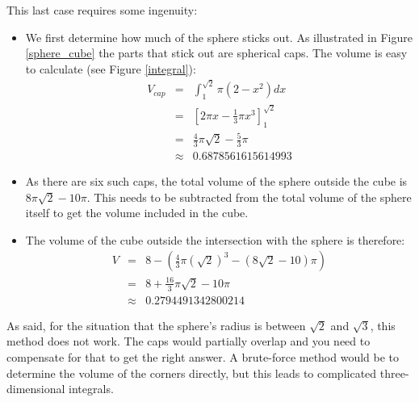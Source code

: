 \documentclass[onecolumn]{article}
\begin{document}
This last case requires some ingenuity:
\begin{itemize}
\item
We first determine how much of the sphere sticks out. As illustrated in Figure \ref{sphere_cube} the
parts that stick out are spherical caps. The volume is easy to calculate (see Figure \ref{integral}):
\begin{eqnarray}
\nonumber V_{cap} &=& \int_{1}^{\sqrt{2}} \pi (2 - x^2) dx \\
\nonumber         &=& \left [2 \pi x - \frac{1}{3} \pi x^3 \right ]_{1}^{\sqrt{2}} \\
\nonumber         &=& \frac{4}{3} \pi \sqrt{2} - \frac{5}{3} \pi \\
\nonumber         &\approx& 0.6878561615614993
\end{eqnarray}

\item
As there are six such caps, the total volume of the sphere outside the cube is $8 \pi \sqrt{2} - 10 \pi$. This
needs to be subtracted from the total volume of the sphere itself to get the volume included in the cube.

\item
The volume of the cube outside the intersection with the sphere is therefore:
\begin{eqnarray}
\nonumber V &=& 8 - \left ( \frac{4}{3} \pi (\sqrt{2})^3 - (8 \sqrt{2} - 10) \pi \right ) \\
\nonumber   &=& 8 + \frac{16}{3} \pi \sqrt{2} - 10 \pi \\
\nonumber   &\approx& 0.2794491342800214
\end{eqnarray}

\end{itemize}

As said, for the situation that the sphere's radius is between $\sqrt{2}$ and $\sqrt{3}$, this method
does not work. The caps would partially overlap and you need to compensate for that to get the right
answer. A brute-force method would be to determine the volume of the corners directly, but this leads
to complicated three-dimensional integrals.
\end{document}
